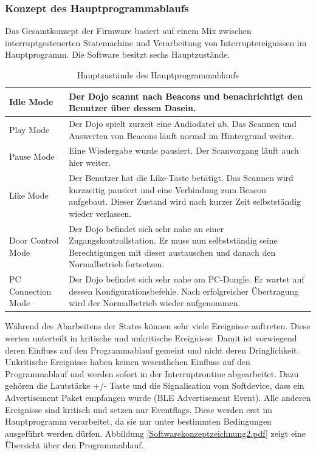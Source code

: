 \subsubsection{Konzept des Hauptprogrammablaufs}
Das Gesamtkonzept der Firmware basiert auf einem Mix zwischen interruptgesteuerten Statemachine und Verarbeitung von Interruptereignissen im Hauptprogramm. Die Software besitzt sechs Hauptzustände. 
\begin{table}[h]
  \centering
  \begin{tabular}{|p{4cm}|p{11cm}|}
    \hline
    Idle Mode & Der Dojo scannt nach Beacons und benachrichtigt den Benutzer über dessen Dasein.\\
    \hline
    Play Mode & Der Dojo spielt zurzeit eine Audiodatei ab. Das Scannen und Auswerten von Beacons läuft normal im Hintergrund weiter. \\
    \hline
    Pause Mode & Eine Wiedergabe wurde pausiert. Der Scanvorgang läuft auch hier weiter. \\
    \hline
    Like Mode & Der Benutzer hat die Like-Taste betätigt. Das Scannen wird kurzzeitig pausiert und eine Verbindung zum Beacon aufgebaut. Dieser Zustand wird nach kurzer Zeit selbstständig wieder verlassen. \\
    \hline
    Door Control Mode & Der Dojo befindet sich sehr nahe an einer Zugangskontrollstation. Er muss nun selbstständig seine Berechtigungen mit dieser austauschen und danach den Normalbetrieb fortsetzen. \\
    \hline
    PC Connection Mode & Der Dojo befindet sich sehr nahe am PC-Dongle. Er wartet auf dessen Konfigurationsbefehle. Nach erfolgreicher Übertragung wird der Normalbetrieb wieder aufgenommen.\\
    \hline
  \end{tabular}
  \caption{Hauptzustände des Hauptprogrammablaufs}\label{tab:BLE_2}
\end{table}

Während des Abarbeitens der States können sehr viele Ereignisse auftreten. Diese werten unterteilt in kritische und unkritische Ereignisse. Damit ist vorwiegend deren Einfluss auf den Programmablauf gemeint und nicht deren Dringlichkeit. 
Unkritische Ereignisse haben keinen wesentlichen Einfluss auf den Programmablauf und werden sofort in der Interruptroutine abgearbeitet. Dazu gehören die Lautstärke +/- Taste und die Signalisation vom Softdevice, dass ein Advertisement Paket empfangen wurde (BLE Advertisement Event).
Alle anderen Ereignisse sind kritisch und setzen nur Eventflags. Diese werden erst im Hauptprogramm verarbeitet, da sie nur unter bestimmten Bedingungen ausgeführt werden dürfen. Abbildung \ref{Softwarekonzeptzeichnung2.pdf} zeigt eine Übersicht über den Programmablauf. \\

